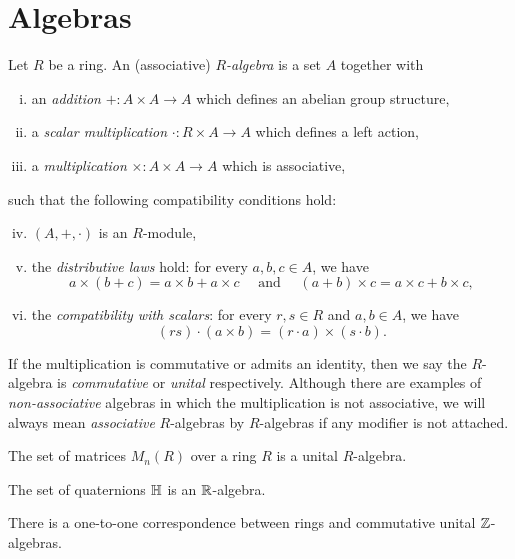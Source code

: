 \documentclass{../../large}
\begin{document}
\section{Algebras}
\begin{prb}
Let $R$ be a ring.
An (associative) \emph{$R$-algebra} is a set $A$ together with
\begin{enumerate}[(i)]
\item an \emph{addition} $+:A\times A\to A$ which defines an abelian group structure,
\item a \emph{scalar multiplication} $\cdot:R\times A\to A$ which defines a left action,
\item a \emph{multiplication} $\times:A\times A\to A$ which is associative,
\end{enumerate}
such that the following compatibility conditions hold:
\begin{enumerate}[(i)]\setcounter{enumi}{3}
\item $(A,+,\cdot)$ is an $R$-module,
\item the \emph{distributive laws} hold: for every $a,b,c\in A$, we have
\[a\times(b+c)=a\times b+a\times c\quad\text{ and }\quad(a+b)\times c=a\times c+b\times c,\]
\item the \emph{compatibility with scalars}: for every $r,s\in R$ and $a,b\in A$, we have
\[(rs)\cdot(a\times b)=(r\cdot a)\times(s\cdot b).\]
\end{enumerate}
If the multiplication is commutative or admits an identity, then we say the $R$-algebra is \emph{commutative} or \emph{unital} respectively.
Although there are examples of \emph{non-associative} algebras in which the multiplication is not associative, we will always mean \emph{associative} $R$-algebras by $R$-algebras if any modifier is not attached.
\begin{parts}
\item The set of matrices $M_n(R)$ over a ring $R$ is a unital $R$-algebra.
\item The set of quaternions $\mathbb{H}$ is an $\mathbb{R}$-algebra.
\item There is a one-to-one correspondence between rings and commutative unital $\mathbb{Z}$-algebras.
\end{parts}
\end{prb}
\end{document}
